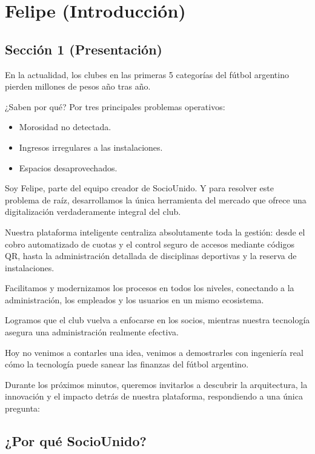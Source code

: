 \section{Felipe (Introducción)}

\subsection{Sección 1 (Presentación)}

En la actualidad, los clubes en las primeras 5 categorías del fútbol argentino pierden millones de pesos año tras año.

¿Saben por qué? Por tres principales problemas operativos:
\begin{itemize}
    \item Morosidad no detectada.
    \item Ingresos irregulares a las instalaciones.
    \item Espacios desaprovechados.
\end{itemize}

Soy Felipe, parte del equipo creador de SocioUnido. Y para resolver este problema de raíz, desarrollamos la única herramienta del mercado que ofrece una digitalización verdaderamente integral del club.

Nuestra plataforma inteligente centraliza absolutamente toda la gestión: desde el cobro automatizado de cuotas y el control seguro de accesos mediante códigos QR, hasta la administración detallada de disciplinas deportivas y la reserva de instalaciones.

Facilitamos y modernizamos los procesos en todos los niveles, conectando a la administración, los empleados y los usuarios en un mismo ecosistema.

Logramos que el club vuelva a enfocarse en los socios, mientras nuestra tecnología asegura una administración realmente efectiva.

Hoy no venimos a contarles una idea, venimos a demostrarles con ingeniería real cómo la tecnología puede sanear las finanzas del fútbol argentino.

Durante los próximos minutos, queremos invitarlos a descubrir la arquitectura, la innovación y el impacto detrás de nuestra plataforma, respondiendo a una única pregunta:

\subsection*{¿Por qué SocioUnido?}

